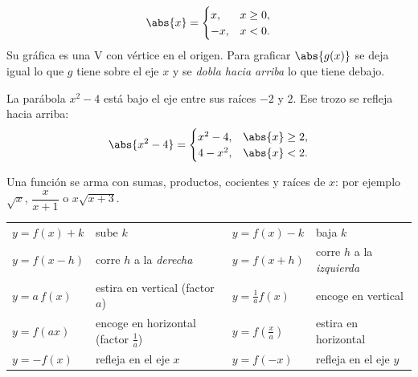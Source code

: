 \documentclass[11pt,a4paper]{article}
\let\nivelorig\nivel
\renewcommand{\nivel}[2]{\Needspace{8\baselineskip}\nivelorig{#1}{#2}}
\begin{document}
\begin{propiedad}
\[ \abs{x}=\begin{cases} x, & x\ge0,\\ -x, & x<0.\end{cases} \]
Su gráfica es una V con vértice en el origen. Para graficar $\abs{g(x)}$ se deja igual lo que $g$ tiene sobre el
eje $x$ y se \emph{dobla hacia arriba} lo que tiene debajo.
\end{propiedad}

\begin{minipage}[c]{0.5\linewidth}
\begin{ejemplo}
La parábola $x^2-4$ está bajo el eje entre sus raíces $-2$ y $2$. Ese trozo se refleja hacia arriba:
\[ \abs{x^2-4}=\begin{cases} x^2-4, & \abs{x}\ge 2,\\ 4-x^2, & \abs{x}<2.\end{cases} \]
\end{ejemplo}
Una función  se arma con sumas, productos, cocientes y raíces de $x$: por ejemplo
$\sqrt{x}$, $\dfrac{x}{x+1}$ o $x\sqrt{x+3}$.
\end{minipage}\hfill
\begin{minipage}[c]{0.45\linewidth}\centering
{}
\end{minipage}


\begin{propiedad}[Cómo se mueve la gráfica de $y=f(x)$, con $h,k>0$ y $a>1$]
\renewcommand{\arraystretch}{1.3}
\begin{tabularx}{\linewidth}{@{}l L l L@{}}
$y=f(x)+k$ & sube $k$ & $y=f(x)-k$ & baja $k$\\
$y=f(x-h)$ & corre $h$ a la \emph{derecha} & $y=f(x+h)$ & corre $h$ a la \emph{izquierda}\\
$y=a\,f(x)$ & estira en vertical (factor $a$) & $y=\tfrac1a f(x)$ & encoge en vertical\\
$y=f(ax)$ & encoge en horizontal (factor $\tfrac1a$) & $y=f\!\left(\tfrac xa\right)$ & estira en horizontal\\
$y=-f(x)$ & refleja en el eje $x$ & $y=f(-x)$ & refleja en el eje $y$
\end{tabularx}
\end{propiedad}
\end{document}
